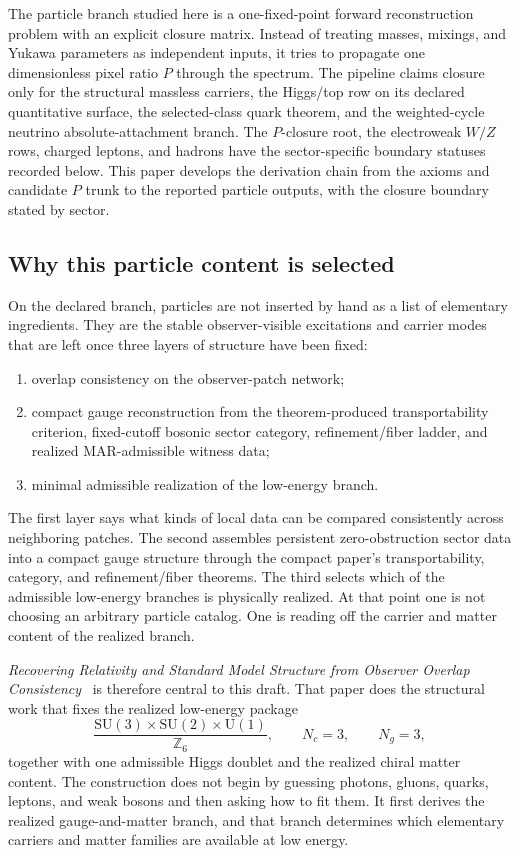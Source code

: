 \documentclass[11pt]{article}
\newcommand{\SU}{\mathrm{SU}}
\newcommand{\U}{\mathrm{U}}
\begin{document}
The particle branch studied here is a one-fixed-point forward reconstruction problem with an
explicit closure matrix. Instead of treating masses, mixings, and Yukawa parameters as independent
inputs, it tries to propagate one dimensionless pixel ratio \(P\) through the spectrum. The
pipeline claims closure only for the structural massless carriers, the Higgs/top row on its
declared quantitative surface, the selected-class quark theorem, and the weighted-cycle neutrino
absolute-attachment branch. The \(P\)-closure root, the electroweak \(W/Z\) rows, charged leptons,
and hadrons have the sector-specific boundary statuses recorded below. This paper develops the
derivation chain from the axioms and candidate \(P\) trunk to the reported particle outputs, with
the closure boundary stated by sector.

\subsection{Why this particle content is selected}

On the declared branch, particles are not inserted by hand as a list of elementary
ingredients. They are the stable observer-visible excitations and carrier modes that
are left once three layers of structure have been fixed:
\begin{enumerate}[leftmargin=2em]
\item overlap consistency on the observer-patch network;
\item compact gauge reconstruction from the theorem-produced transportability criterion, fixed-cutoff bosonic sector category, refinement/fiber ladder, and realized MAR-admissible witness data;
\item minimal admissible realization of the low-energy branch.
\end{enumerate}
The first layer says what kinds of local data can be compared consistently across neighboring
patches. The second assembles persistent zero-obstruction sector data into a compact gauge
structure through the compact paper's transportability, category, and refinement/fiber theorems.
The third selects which of the admissible low-energy branches is physically realized.
At that point one is not choosing an arbitrary particle catalog. One is reading off the
carrier and matter content of the realized branch.

\emph{Recovering Relativity and Standard Model Structure from Observer Overlap Consistency}~\cite{ophcompact} is therefore central to this draft. That paper does
the structural work that fixes the realized low-energy package
\[
\frac{\SU(3)\times\SU(2)\times\U(1)}{\mathbb Z_6},
\qquad
N_c=3,
\qquad
N_g=3,
\]
together with one admissible Higgs doublet and the realized chiral matter content. The
construction does not begin by guessing photons, gluons, quarks, leptons, and weak bosons and
then asking how to fit them. It first derives the realized gauge-and-matter branch, and that
branch determines which elementary carriers and matter families are available at low energy.
\end{document}

